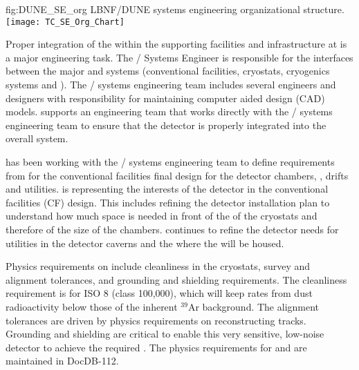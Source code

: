 \begin{dunefigure}{fig:DUNE_SE_org}
  {LBNF/DUNE systems engineering organizational structure.}
   \texttt{[image: TC\_SE\_Org\_Chart]}
\end{dunefigure}

Proper integration of the  within the supporting
facilities and infrastructure at \surf is a major engineering task.
The / Systems Engineer is responsible for the
interfaces between the major  and  systems
(conventional facilities, cryostats, cryogenics systems and
). The / systems engineering team
includes several engineers and designers with responsibility for
maintaining computer aided design (CAD) models.  
supports an engineering team that works directly with the
/ systems engineering team to ensure that the
detector is properly integrated into the overall system.

 has been working with the / systems engineering team to
define requirements from  for the conventional facilities final
design for the detector chambers, , drifts
and utilities.  is representing the interests of the  detector
in the conventional facilities (CF) design. This includes refining the
detector installation plan to understand how much space is needed in
front of the  of the cryostats
and therefore of the size of the chambers.  continues to refine the
detector needs for utilities in the detector caverns and the  
where the  will be housed.

Physics requirements on  include cleanliness in the cryostats,
survey and alignment tolerances, and grounding and shielding
requirements. The cleanliness requirement is for ISO 8 (class
100,000), which will keep rates from dust radioactivity below those of
the inherent $^{39}$Ar background. The alignment tolerances are driven
by physics requirements on reconstructing tracks. Grounding and
shielding are critical to enable this very sensitive, low-noise
detector to achieve the required . The physics
requirements for  and  are maintained in
DocDB-112.
